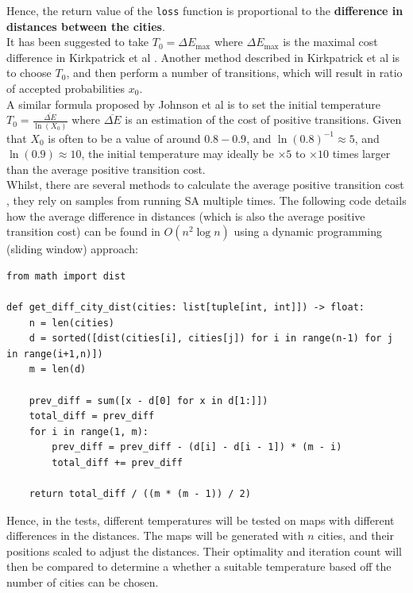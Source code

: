 \documentclass{article}
\begin{document}
Hence, the return value of the \texttt{loss} function is proportional to the \textbf{difference in distances between the cities}.
\\

It has been suggested to take $T_0 = \Delta E_{\text{max}}$ where $\Delta E_{\text{max}}$ is the maximal cost difference in Kirkpatrick et al \cite{kirkpatrick}.
Another method described in Kirkpatrick et al \cite{kirkpatrick} is to choose $T_0$, and then perform a number of transitions, which will result in ratio of accepted probabilities $x_0$.
\\

A similar formula proposed by Johnson et al is to set the initial temperature $T_0 = \frac{\overline{\Delta E}}{\ln(X_0)}$ where $\overline{\Delta E}$ is an estimation of the cost of positive transitions.
Given that $X_0$ is often to be a value of around $0.8 - 0.9$, and $\ln(0.8)^{-1} \approx 5$, and $\ln(0.9) \approx 10$, the initial temperature may ideally be $\times 5$ to  $\times 10$ times larger than the average positive transition cost.
\\

Whilst, there are several methods to calculate the average positive transition cost \cite{initial-temperature}, they rely on samples from running SA multiple times.
The following code details how the average difference in distances (which is also the average positive transition cost) can be found in $O(n^2 \log n)$ using a dynamic programming (sliding window) approach:

\begin{verbatim}
from math import dist

def get_diff_city_dist(cities: list[tuple[int, int]]) -> float:
    n = len(cities)
    d = sorted([dist(cities[i], cities[j]) for i in range(n-1) for j in range(i+1,n)])
    m = len(d)
    
    prev_diff = sum([x - d[0] for x in d[1:]])
    total_diff = prev_diff
    for i in range(1, m):
        prev_diff = prev_diff - (d[i] - d[i - 1]) * (m - i)
        total_diff += prev_diff
    
    return total_diff / ((m * (m - 1)) / 2)
\end{verbatim}

Hence, in the tests, different temperatures will be tested on maps with different differences in the distances.
The maps will be generated with $n$ cities, and their positions scaled to adjust the distances.
Their optimality and iteration count will then be compared to determine a whether a suitable temperature based off the number of cities can be chosen.
\end{document}
